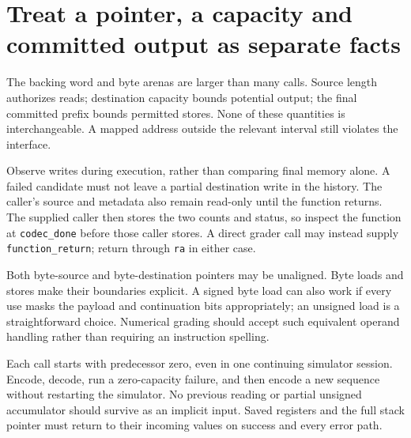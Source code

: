 \section{Treat a pointer, a capacity and committed output as separate facts}
The backing word and byte arenas are larger than many calls. Source length authorizes
reads; destination capacity bounds potential output; the final committed prefix bounds
permitted stores. None of these quantities is interchangeable. A mapped address outside
the relevant interval still violates the interface.

Observe writes during execution, rather than comparing final memory alone. A failed
candidate must not leave a partial destination write in the history. The caller's
source and metadata also remain read-only until the function returns. The supplied
caller then stores the two counts and status, so inspect the function at
\texttt{codec\_done} before those caller stores. A direct grader call may instead
supply \texttt{function\_return}; return through \texttt{ra} in either case.

Both byte-source and byte-destination pointers may be unaligned. Byte loads and stores
make their boundaries explicit. A signed byte load can also work if every use masks
the payload and continuation bits appropriately; an unsigned load is a straightforward
choice. Numerical grading should accept such equivalent operand handling rather than
requiring an instruction spelling.

Each call starts with predecessor zero, even in one continuing simulator session.
Encode, decode, run a zero-capacity failure, and then encode a new sequence without
restarting the simulator. No previous reading or partial unsigned accumulator should
survive as an implicit input. Saved registers and the full stack pointer must return
to their incoming values on success and every error path.
